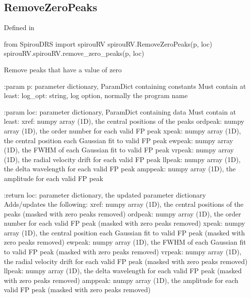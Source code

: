 \noindent\begin{minipage}{\textwidth}
\subsection{RemoveZeroPeaks}

Defined in \spirouRV{}

\begin{pythonbox}
from SpirouDRS import spirouRV
spirouRV.RemoveZeroPeaks(p, loc)
spirouRV.spirouRV.remove_zero_peaks(p, loc)
\end{pythonbox}

\begin{pythondocstring}
Remove peaks that have a value of zero

:param p: parameter dictionary, ParamDict containing constants
    Must contain at least:
            log_opt: string, log option, normally the program name

:param loc: parameter dictionary, ParamDict containing data
        Must contain at least:
            xref: numpy array (1D), the central positions of the peaks
            ordpeak: numpy array (1D), the order number for each valid FP
                     peak
            xpeak: numpy array (1D), the central position each Gaussian fit
                   to valid FP peak
            ewpeak: numpy array (1D), the FWHM of each Gaussian fit
                    to valid FP peak
            vrpeak: numpy array (1D), the radial velocity drift for each
                    valid FP peak
            llpeak: numpy array (1D), the delta wavelength for each valid
                    FP peak
            amppeak: numpy array (1D), the amplitude for each valid FP peak

:return loc: parameter dictionary, the updated parameter dictionary
        Adds/updates the following:
            xref: numpy array (1D), the central positions of the peaks
                  (masked with zero peaks removed)
            ordpeak: numpy array (1D), the order number for each valid FP
                     peak (masked with zero peaks removed)
            xpeak: numpy array (1D), the central position each Gaussian fit
                   to valid FP peak (masked with zero peaks removed)
            ewpeak: numpy array (1D), the FWHM of each Gaussian fit
                    to valid FP peak (masked with zero peaks removed)
            vrpeak: numpy array (1D), the radial velocity drift for each
                    valid FP peak (masked with zero peaks removed)
            llpeak: numpy array (1D), the delta wavelength for each valid
                    FP peak (masked with zero peaks removed)
            amppeak: numpy array (1D), the amplitude for each valid FP peak
                     (masked with zero peaks removed)
\end{pythondocstring}
\end{minipage}

